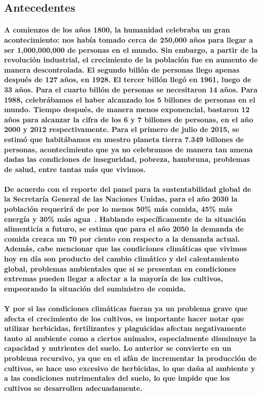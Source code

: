 \documentclass[10pt, twocolumn]{article}
\begin{document}
\subsection{Antecedentes}
\paragraph{A comienzos de los años 1800, la humanidad celebraba un gran acontecimiento: nos había tomado cerca de 250,000 años para llegar a ser 1,000,000,000 de personas en el mundo. Sin embargo, a partir de la revolución industrial, el crecimiento de la población fue en aumento de manera descontrolada. El segundo billón de personas llego apenas después de 127 años, en 1928. El tercer billón llegó en 1961, luego de 33 años. Para el cuarto billón de personas se necesitaron 14 años. Para 1988, celebrábamos el haber alcanzado los 5 billones de personas en el mundo. Tiempo después, de manera menos exponencial, bastaron 12 años para alcanzar la cifra de los 6 y 7 billones de personas, en el año 2000 y 2012 respectivamente. Para el primero de julio de 2015, se estimó que habitábamos en nuestro planeta tierra 7.349 billones de personas, acontecimiento que ya no celebramos de manera tan amena dadas las condiciones de inseguridad, pobreza, hambruna, problemas de salud, entre tantas más que vivimos.}

\paragraph{De acuerdo con el reporte del panel para la sustentabilidad global de la Secretaría General de las Naciones Unidas, para el año 2030 la población requerirá de por lo menos 50\% más comida, 45\% más energía y 30\% más agua~\cite{globalsustainabilityreport}. Hablando específicamente de la situación alimenticia a futuro, se estima que para el año 2050 la demanda de comida crezca un 70 por ciento con respecto a la demanda actual. \\ Además, cabe mencionar que las condiciones climáticas que vivimos hoy en día son producto del cambio climático y del calentamiento global, problemas ambientales que si se presentan en condiciones extremas pueden llegar a afectar a la mayoría de los cultivos, empeorando la situación del suministro de comida.}

\paragraph{Y por si las condiciones climáticas fueran ya un problema grave que afecta el crecimiento de los cultivos, es importante hacer notar que utilizar herbicidas, fertilizantes y plaguicidas afectan negativamente tanto al ambiente como a ciertos animales, especialmente disminuye la capacidad y nutrientes del suelo. Lo anterior se convierte en un problema recursivo, ya que en el afán de incrementar la producción de cultivos, se hace uso excesivo de herbicidas, lo que daña al ambiente y a las condiciones nutrimentales del suelo, lo que impide que los cultivos se desarrollen adecuadamente.}
\end{document}
